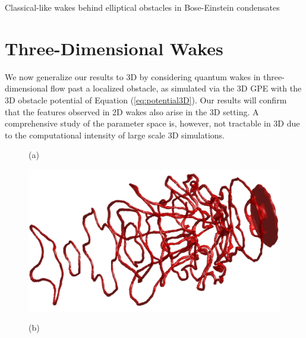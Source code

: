 \begin{chapter}{\label{cha:wake}Classical-like wakes behind elliptical obstacles in Bose-Einstein condensates}
\section{Three-Dimensional Wakes}
We now generalize our results to 3D by considering quantum wakes in three-dimensional flow past a localized obstacle, as simulated via the 3D GPE with the 3D obstacle potential of Equation (\ref{eq:potential3D}).  Our results will confirm that the features observed in 2D wakes also arise in the 3D setting.  A comprehensive study of the parameter space is, however, not tractable in 3D due to the computational intensity of large scale 3D simulations.



\begin{figure}[!ht]
(a)\\
\begin{minipage}{0.5\linewidth}%
\centering
\includegraphics[width=0.9\linewidth]{wake/symwake}
\end{minipage}%
\begin{minipage}{0.5\linewidth}%
\vspace{-0.84\baselineskip}(b)\\
\end{minipage}
\end{figure}
\end{chapter}
